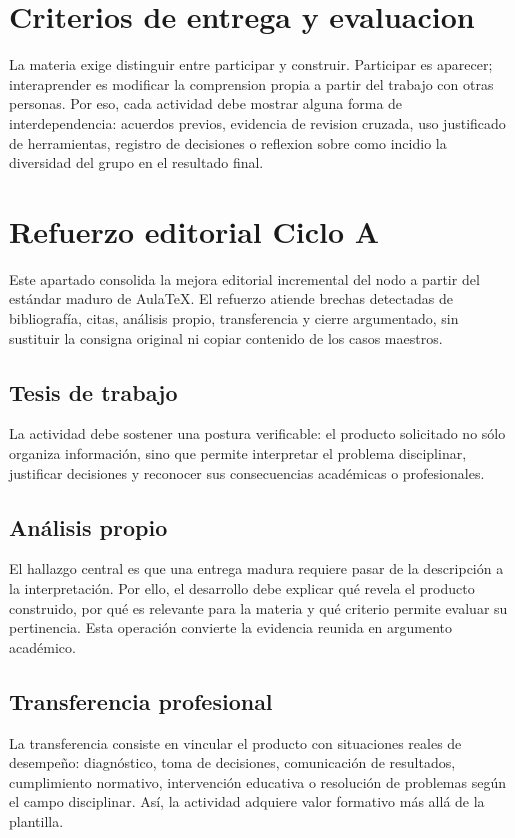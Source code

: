 \documentclass[
  spanish,
  letterpaper, oneside
]{article}
\begin{document}
\section{Criterios de entrega y evaluacion}

La materia exige distinguir entre participar y construir. Participar es aparecer;
interaprender es modificar la comprension propia a partir del trabajo con otras
personas. Por eso, cada actividad debe mostrar alguna forma de interdependencia:
acuerdos previos, evidencia de revision cruzada, uso justificado de herramientas,
registro de decisiones o reflexion sobre como incidio la diversidad del grupo en
el resultado final.

\section*{Refuerzo editorial Ciclo A}
Este apartado consolida la mejora editorial incremental del nodo a partir del estándar maduro de AulaTeX. El refuerzo atiende brechas detectadas de bibliografía, citas, análisis propio, transferencia y cierre argumentado, sin sustituir la consigna original ni copiar contenido de los casos maestros.

\subsection*{Tesis de trabajo}
La actividad debe sostener una postura verificable: el producto solicitado no sólo organiza información, sino que permite interpretar el problema disciplinar, justificar decisiones y reconocer sus consecuencias académicas o profesionales.

\subsection*{Análisis propio}
El hallazgo central es que una entrega madura requiere pasar de la descripción a la interpretación. Por ello, el desarrollo debe explicar qué revela el producto construido, por qué es relevante para la materia y qué criterio permite evaluar su pertinencia. Esta operación convierte la evidencia reunida en argumento académico.

\subsection*{Transferencia profesional}
La transferencia consiste en vincular el producto con situaciones reales de desempeño: diagnóstico, toma de decisiones, comunicación de resultados, cumplimiento normativo, intervención educativa o resolución de problemas según el campo disciplinar. Así, la actividad adquiere valor formativo más allá de la plantilla.
\end{document}

